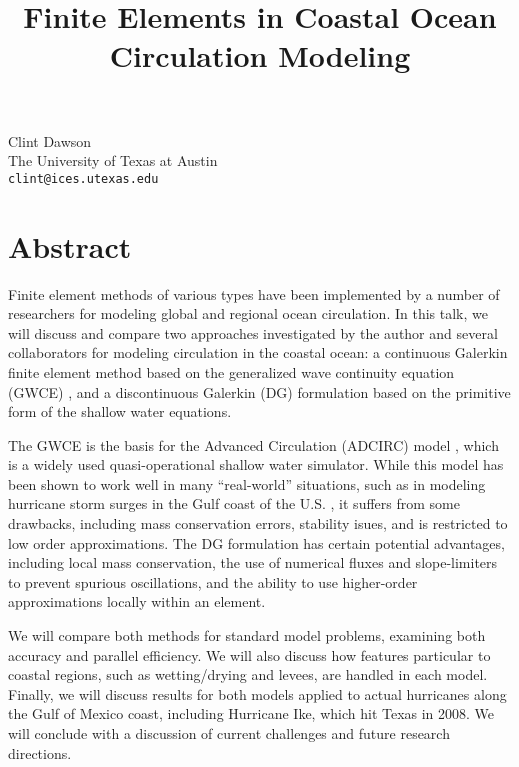 \title{Finite Elements in Coastal Ocean Circulation Modeling}
\author{} \institute{}
\maketitle

\begin{center}
{\large Clint Dawson}\\
The University of Texas at Austin\\
{\tt clint@ices.utexas.edu}
\end{center}

\section*{Abstract}
Finite element methods of various types have been implemented by a number of researchers for modeling global and regional ocean circulation.  In this talk, we will discuss and compare two approaches investigated by the author and several collaborators for modeling circulation in the coastal ocean: a continuous Galerkin finite element method based on the generalized wave continuity equation (GWCE) \cite{dawson1}, and a discontinuous Galerkin (DG) formulation \cite{dawson2,dawson3} based on the primitive form of the shallow water equations.

The GWCE is the basis for the Advanced Circulation (ADCIRC) model \cite{dawson4}, which is a widely used quasi-operational shallow water simulator.    While this model has been shown to work well in many ``real-world'' situations, such as in modeling hurricane storm surges in the Gulf coast of the U.S. \cite{dawson5}, it suffers from some drawbacks, including mass conservation errors, stability isues, and is restricted to low order approximations.  The DG formulation has certain potential advantages, including local mass conservation, the use of numerical fluxes and slope-limiters to prevent spurious oscillations, and the ability to use higher-order approximations locally within an element.

We will compare both methods for standard model problems, examining both accuracy and parallel efficiency.  We will also discuss how features particular to coastal regions, such as wetting/drying and levees, are handled in each model. Finally, we will discuss results for both models  applied to actual hurricanes along the Gulf of Mexico coast, including Hurricane Ike, which hit Texas in 2008.  We will conclude with a discussion of current challenges and future research directions.

